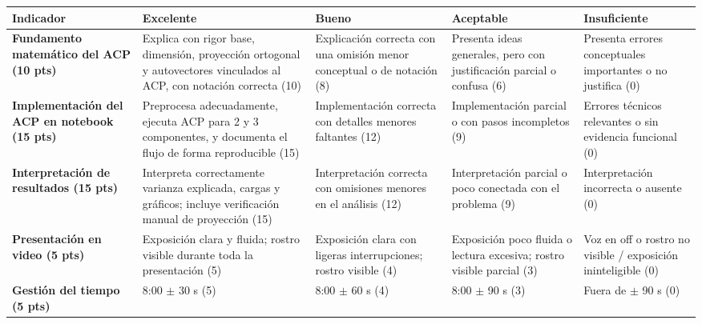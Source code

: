\documentclass[a4,11pt]{aleph-notas}
\begin{document}
\begin{landscape}
\begin{center}\footnotesize
\begin{tabular}{p{5cm}p{4cm}p{4cm}p{4cm}p{4cm}}
\toprule
\textbf{Indicador} & \textbf{Excelente} & \textbf{Bueno} & \textbf{Aceptable} & \textbf{Insuficiente} \\ \midrule
\textbf{Fundamento matemático del ACP (10 pts)} & Explica con rigor base, dimensión, proyección ortogonal y autovectores vinculados al ACP, con notación correcta (10) & Explicación correcta con una omisión menor conceptual o de notación (8) & Presenta ideas generales, pero con justificación parcial o confusa (6) & Presenta errores conceptuales importantes o no justifica (0) \\ \midrule
\textbf{Implementación del ACP en notebook (15 pts)} & Preprocesa adecuadamente, ejecuta ACP para 2 y 3 componentes, y documenta el flujo de forma reproducible (15) & Implementación correcta con detalles menores faltantes (12) & Implementación parcial o con pasos incompletos (9) & Errores técnicos relevantes o sin evidencia funcional (0) \\ \midrule
\textbf{Interpretación de resultados (15 pts)} & Interpreta correctamente varianza explicada, cargas y gráficos; incluye verificación manual de proyección (15) & Interpretación correcta con omisiones menores en el análisis (12) & Interpretación parcial o poco conectada con el problema (9) & Interpretación incorrecta o ausente (0) \\ \midrule
\textbf{Presentación en video (5 pts)}
& Exposición clara y fluida; rostro visible durante toda la presentación (5)
& Exposición clara con ligeras interrupciones; rostro visible (4)
& Exposición poco fluida o lectura excesiva; rostro visible parcial (3)
& Voz en off o rostro no visible / exposición ininteligible (0) \\ \midrule
\textbf{Gestión del tiempo (5 pts)} & 8:00 $\pm$ 30 s (5) & 8:00 $\pm$ 60 s (4) & 8:00 $\pm$ 90 s (3) & Fuera de $\pm$ 90 s (0) \\ \bottomrule
\end{tabular}
\end{center}
\end{landscape}
\end{document}

